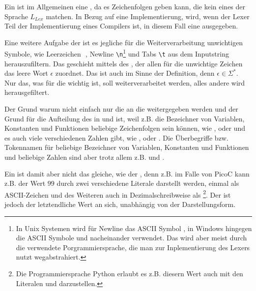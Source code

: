 Ein  ist im Allgemeinen eine , da es Zeichenfolgen geben kann, die kein  eines  der Sprache $L_{Lex}$ matchen. In Bezug auf eine Implementierung, wird, wenn der Lexer Teil der Implementierung eines Compilers ist, in diesem Fall eine  ausgegeben.

Eine weitere Aufgabe der  ist es jegliche für die Weiterverarbeitung unwichtigen Symbole, wie Leerzeichen \,\textvisiblespace\,, Newline \verb|\n|\footnote{In Unix Systemen wird für Newline das ASCII Symbol , in Windows hingegen die ASCII Symbole  und  nacheinander verwendet. Das wird aber meist durch die verwendete Porgrammiersprache, die man zur Inplementierung des Lexers nutzt wegabstrahiert.} und Tabs \verb|\t| aus dem Inputstring herauszufiltern. Das geschieht mittels des , der allen für die  unwichtige Zeichen das leere Wort $\epsilon$ zuordnet. Das ist auch im Sinne der Definition, denn $\epsilon \in \Sigma^{*}$.
Nur das, was für die  wichtig ist, soll weiterverarbeitet werden, alles andere wird herausgefiltert.

Der Grund warum nicht einfach nur die  an die  weitergegeben werden und der Grund für die Aufteilung des  in  und  ist, weil z.B. die Bezeichner von Variablen, Konstanten und Funktionen beliebige Zeichenfolgen sein können, wie ,  oder  und es auch viele verschiedenen Zahlen gibt, wie ,  oder . Die Überbegriffe bzw. Tokennamen für beliebige Bezeichner von Variablen, Konstanten und Funktionen und beliebige Zahlen sind aber trotz allem z.B.  und .

Ein  ist damit aber nicht das gleiche, wie der , denn z.B. im Falle von PicoC kann z.B. der Wert $99$ durch zwei verschiedene Literale darstellt werden, einmal als ASCII-Zeichen  und des Weiteren auch in Dezimalschreibweise als \footnote{Die Programmiersprache Python erlaubt es z.B. diesern Wert auch mit den Literalen  und  darzustellen.}. Der  ist jedoch der letztendliche Wert an sich, unabhängig von der Darstellungsform.

